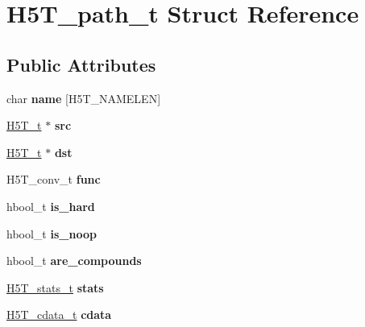 \hypertarget{struct_h5_t__path__t}{}\section{H5\+T\+\_\+path\+\_\+t Struct Reference}
\label{struct_h5_t__path__t}
\subsection*{Public Attributes}
\begin{DoxyCompactItemize}
\item 
\mbox{\label{struct_h5_t__path__t_ad5e54118c6351dbd8f22514ca9027dfb}} 
char {\bfseries name} \mbox{[}H5\+T\+\_\+\+N\+A\+M\+E\+L\+EN\mbox{]}
\item 
\mbox{\label{struct_h5_t__path__t_ab3563d087a01256c59215eae52f1baaf}} 
\hyperlink{struct_h5_t__t}{H5\+T\+\_\+t} $\ast$ {\bfseries src}
\item 
\mbox{\label{struct_h5_t__path__t_a6afb4225085ba44a0af6269516ae60f8}} 
\hyperlink{struct_h5_t__t}{H5\+T\+\_\+t} $\ast$ {\bfseries dst}
\item 
\mbox{\label{struct_h5_t__path__t_ae22dc0389c2a5eeefa20507159669379}} 
H5\+T\+\_\+conv\+\_\+t {\bfseries func}
\item 
\mbox{\label{struct_h5_t__path__t_aa08cf8497e299878d06fdeb707681b18}} 
hbool\+\_\+t {\bfseries is\+\_\+hard}
\item 
\mbox{\label{struct_h5_t__path__t_a2e38dd2881f9c7ccbeb8faee8e88a438}} 
hbool\+\_\+t {\bfseries is\+\_\+noop}
\item 
\mbox{\label{struct_h5_t__path__t_aea52af195744377b3fd577f3be242921}} 
hbool\+\_\+t {\bfseries are\+\_\+compounds}
\item 
\mbox{\label{struct_h5_t__path__t_aa85f036ee554a8f6400aebd113855d44}} 
\hyperlink{struct_h5_t__stats__t}{H5\+T\+\_\+stats\+\_\+t} {\bfseries stats}
\item 
\mbox{\label{struct_h5_t__path__t_aab67b165f06b0d94efb0d79f8672a1c8}} 
\hyperlink{struct_h5_t__cdata__t}{H5\+T\+\_\+cdata\+\_\+t} {\bfseries cdata}
\end{DoxyCompactItemize}


